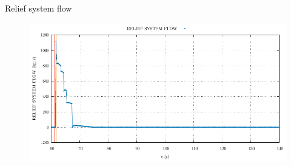 \begin{frame}{Relief system flow}
	\begin{figure}
		\centering
		\includegraphics[width=\textwidth]{./02SteamLineBreak/graphs/RELIEF SYSTEM FLOW.pdf}
		
	\end{figure}
	
\end{frame}


